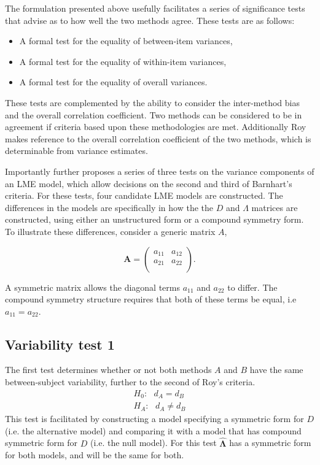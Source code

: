 \documentclass[12pt, a4paper]{report}
\theoremstyle{plain}
\theoremstyle{definition}
\theoremstyle{remark}
\begin{document}
The formulation presented above usefully facilitates a series of
significance tests that advise as to how well the two methods
agree. These tests are as follows:
\begin{itemize}
	\item A formal test for the equality of between-item variances,
	\item A formal test for the equality of within-item variances,
	\item A formal test for the equality of overall variances.
\end{itemize}
These tests are complemented by the ability to consider the inter-method bias and the overall correlation coefficient. Two methods can be considered to be in agreement if criteria based upon these methodologies are met. Additionally Roy makes reference to the overall correlation coefficient of the two methods, which is determinable from variance estimates.


Importantly \citet{ARoy2009} further proposes a series of three tests on the variance components of an LME model, which allow decisions on the second and third of Barnhart's criteria. For these tests, four candidate LME models are constructed. The differences in the models are specifically in how the the $D$ and $\Lambda$ matrices are constructed, using either an unstructured form or a compound symmetry form. To illustrate these differences, consider a generic matrix $A$,

\[
\boldsymbol{A} = \left( \begin{array}{cc}
a_{11} & a_{12}  \\
a_{21} & a_{22}  \\
\end{array}\right).
\]



A symmetric matrix allows the diagonal terms $a_{11}$ and $a_{22}$ to differ. The compound symmetry structure requires that both of these terms be equal, i.e $a_{11} = a_{22}$.




\subsection{Variability test 1}
The first test determines whether or not both methods $A$ and $B$ have the same between-subject variability, further to the second of Roy's criteria.
\begin{eqnarray*}
	H_{0}: \mbox{ }d_{A}  = d_{B} \\
	H_{A}: \mbox{ }d_{A}  \neq d_{B}
\end{eqnarray*}
This test is facilitated by constructing a model specifying a symmetric form for $D$ (i.e. the alternative model) and comparing it with a model that has compound symmetric form for $D$ (i.e. the null model). For this test $\boldsymbol{\hat{\Lambda}}$ has a symmetric form for both models, and will be the same for both.
\end{document}
